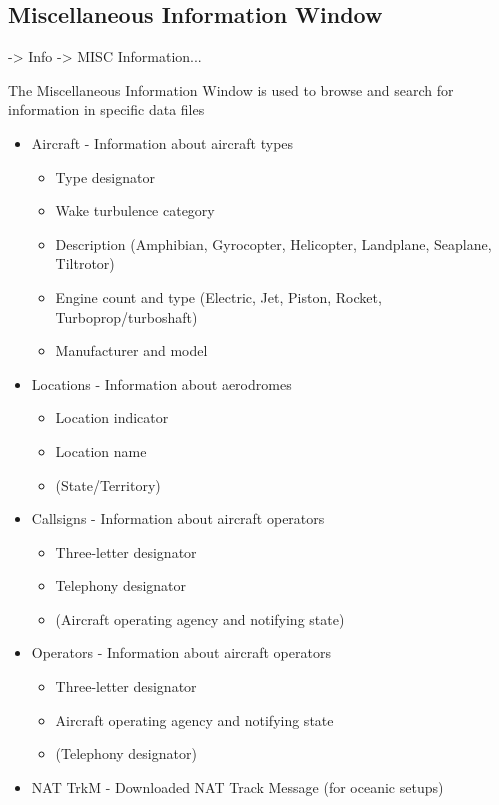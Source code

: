 \documentclass[a4paper,oneside,11pt]{memoir}
\begin{document}
\subsection{Miscellaneous Information Window}
\label{win:minfw}

 -> Info -> MISC Information...

\bigskip


The Miscellaneous Information Window is used to browse and search for information in specific data files

\begin{itemize}
    \item Aircraft - Information about aircraft types
    \begin{itemize}
        \item Type designator
        \item Wake turbulence category
        \item Description (Amphibian, Gyrocopter, Helicopter, Landplane, Seaplane, Tiltrotor)
        \item Engine count and type (Electric, Jet, Piston, Rocket, Turboprop/turboshaft)
        \item Manufacturer and model
    \end{itemize}
    \item Locations - Information about aerodromes
    \begin{itemize}
        \item Location indicator
        \item Location name
        \item (State/Territory)
    \end{itemize}
    \item Callsigns - Information about aircraft operators
    \begin{itemize}
        \item Three-letter designator
        \item Telephony designator
        \item (Aircraft operating agency and notifying state)
    \end{itemize}   
    \item Operators - Information about aircraft operators
    \begin{itemize}
        \item Three-letter designator
        \item Aircraft operating agency and notifying state
        \item (Telephony designator)
    \end{itemize}
    \item NAT TrkM - Downloaded NAT Track Message (for oceanic setups)
\end{itemize}
\end{document}
